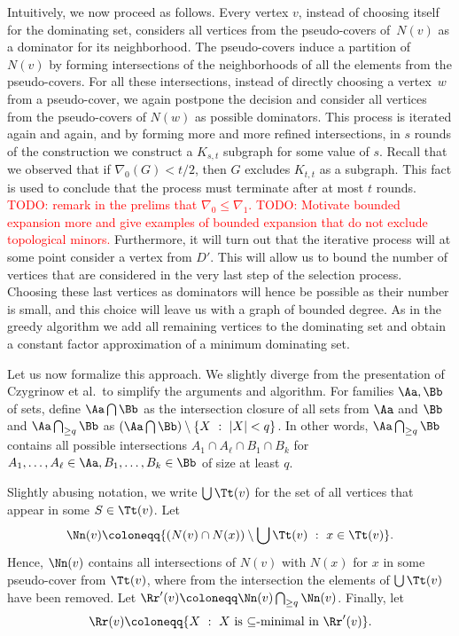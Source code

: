 \smallskip
Intuitively, we now proceed as follows. Every vertex $v$, instead of
choosing itself for the dominating set, considers all vertices from
the pseudo-covers of~$N(v)$ as a dominator for its neighborhood.
The pseudo-covers induce a partition of~$N(v)$ by forming
intersections of the neighborhoods of all the elements from the
pseudo-covers. For all these intersections, instead of directly
choosing a vertex~$w$ from a pseudo-cover, we again postpone
the decision and consider all vertices from the pseudo-covers of
$N(w)$ as possible dominators. This process is iterated again
and again, and by forming more and more refined intersections,
in $s$ rounds of the construction we construct a $K_{s,t}$
subgraph for some value of $s$. Recall that we observed that
if \mbox{$\nabla_0(G)< t/2$}, then $G$ excludes $K_{t,t}$ as
a subgraph. This fact is used to conclude that the process
must terminate after at most $t$ rounds. \textcolor{red}{TODO:
remark in the prelims that $\nabla_0\leq \nabla_1$. TODO:
Motivate bounded expansion more and give examples of bounded
expansion that do not exclude topological minors.} Furthermore,
it will turn out that the iterative process will at some point
consider a vertex from $D'$. This will allow us to bound the
number of vertices that are considered in the very last step
of the selection process. Choosing these last vertices as dominators
will hence be possible as their number is small, and this choice
will leave us with a graph of bounded degree. As in the greedy
algorithm we add all remaining vertices to the dominating set
and obtain a constant factor approximation of a minimum
dominating set.

\smallskip
Let us now formalize this approach. We slightly diverge from the
presentation of Czygrinow et al.\ to simplify the arguments and
algorithm. For families $\Aa, \Bb$ of sets, define
$\Aa\bigcap\Bb$ as the intersection closure of all
sets from $\Aa$ and $\Bb$ and $\Aa\bigcap_{\geq q}\Bb$
as $(\Aa\bigcap\Bb)\setminus \{X~:~|X|<q\}$. In other words,
$\Aa\bigcap_{\geq q}\Bb$ contains all possible intersections
$A_1\cap A_\ell\cap B_1\cap B_k$ for $A_1,\ldots, A_\ell\in \Aa,
B_1,\ldots, B_k\in \Bb$ of size at least $q$.

Slightly abusing notation, we write $\bigcup \Tt(v)$
for the set of all vertices that appear in some $S\in \Tt(v)$.
Let \[\Nn(v)\coloneqq \{(N(v)\cap N(x))\setminus \bigcup\Tt(v)~:~x\in \Tt(v)\}.\]
Hence, $\Nn(v)$ contains all intersections of $N(v)$ with
$N(x)$ for $x$ in some pseudo-cover from $\Tt(v)$, where
from the intersection the elements of $\bigcup\Tt(v)$ have
been removed. Let
$\Rr'(v)\coloneqq \Nn(v)\bigcap_{\geq q}\Nn(v)$. Finally,
let \[\Rr(v) \coloneqq \{X~:~X\text{ is $\subseteq$-minimal in }\Rr'(v)\}.\]

